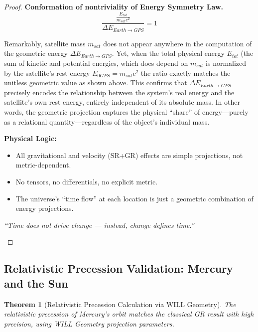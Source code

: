 \documentclass[12pt, a4paper]{article}
\newtheorem{theorem}{Theorem}[section]
\begin{document}
\begin{proof}
\textbf{Conformation of nontriviality of Energy Symmetry Law.} 
\[
\frac{\frac{E_{tot}}{m_{sat}c^{2}}}{\Delta E_{Earth \rightarrow GPS} } = 1
\]

Remarkably, satellite mass $m_{sat}$ does not appear anywhere in the computation of the geometric energy $\Delta E_{Earth \rightarrow GPS}$. Yet, when the total physical energy $E_{tot}$ (the sum of kinetic and potential energies, which does depend on $m_{sat}$ is normalized by the satellite’s rest energy $E_{0GPS} = m_{sat} c^2$ the ratio exactly matches the unitless geometric value as shown above. This confirms that $\Delta E_{Earth \rightarrow GPS}$ precisely encodes the relationship between the system’s real energy and the satellite’s own rest energy, entirely independent of its absolute mass.
In other words, the geometric projection captures the physical “share” of energy—purely as a relational quantity—regardless of the object's individual mass.

\textbf{Physical Logic:}
\begin{itemize}
    \item All gravitational and velocity (SR+GR) effects are simple projections, not metric-dependent.
    \item No tensors, no differentials, no explicit metric.
    \item The universe’s “time flow” at each location is just a geometric combination of energy projections.
\end{itemize}

\begin{center}
\emph{“Time does not drive change — instead, change defines time.”}
\end{center}

\end{proof}

\subsection{Relativistic Precession Validation: Mercury and the Sun}

\begin{theorem}[Relativistic Precession Calculation via WILL Geometry]
The relativistic precession of Mercury's orbit matches the classical GR result with high precision, using WILL Geometry projection parameters.
\end{theorem}
\end{document}
